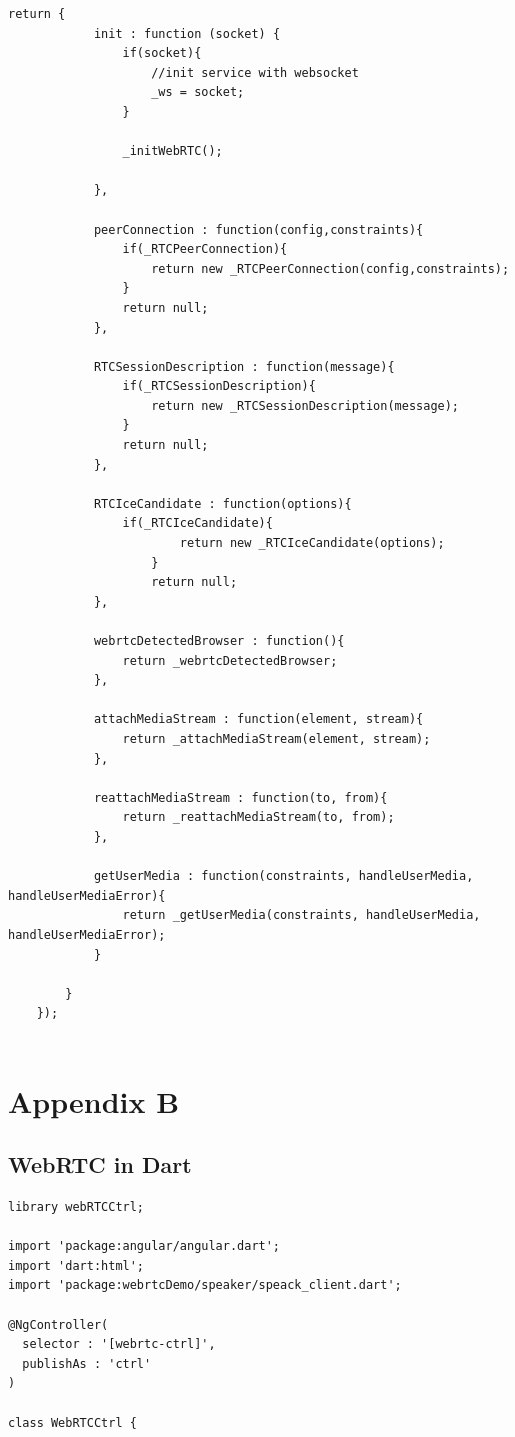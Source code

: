 \begin{appendices}
\begin{lstlisting}[caption={WebRTCService in application client},label={code:webrtc_service}]
		return {
			init : function (socket) {
				if(socket){
					//init service with websocket
					_ws = socket;
				}

				_initWebRTC();

			},

			peerConnection : function(config,constraints){
				if(_RTCPeerConnection){
					return new _RTCPeerConnection(config,constraints);
				}
				return null;
			},

			RTCSessionDescription : function(message){
				if(_RTCSessionDescription){
					return new _RTCSessionDescription(message);
				}
				return null;
			},

			RTCIceCandidate : function(options){
				if(_RTCIceCandidate){
						return new _RTCIceCandidate(options);
					}
					return null;
			},

			webrtcDetectedBrowser : function(){
				return _webrtcDetectedBrowser;
			},

			attachMediaStream : function(element, stream){
				return _attachMediaStream(element, stream);
			},

			reattachMediaStream : function(to, from){
				return _reattachMediaStream(to, from);
			},

			getUserMedia : function(constraints, handleUserMedia, handleUserMediaError){
				return _getUserMedia(constraints, handleUserMedia, handleUserMediaError);
			}

		}
	});	
	
\end{lstlisting}

\chapter{Appendix B}

\section{WebRTC in Dart} \label{research:dart_webrtcctrl}

\begin{lstlisting}[caption={WebRTCCtrl in Dart application client},label={code:dart_webrtcctrl}]
library webRTCCtrl;

import 'package:angular/angular.dart';
import 'dart:html';
import 'package:webrtcDemo/speaker/speack_client.dart';

@NgController(
  selector : '[webrtc-ctrl]',
  publishAs : 'ctrl'
)

class WebRTCCtrl {


\end{lstlisting}
\end{appendices}
